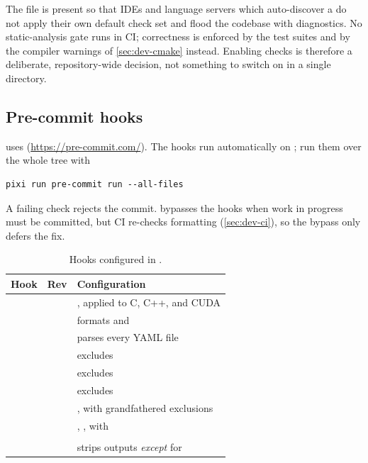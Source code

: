 The file is present so that IDEs and language servers which auto-discover a
 do not apply their own default check set and flood the
codebase with diagnostics. No static-analysis gate runs in CI; correctness is
enforced by the test suites and by the compiler warnings of
\cref{sec:dev-cmake} instead. Enabling checks is therefore a deliberate,
repository-wide decision, not something to switch on in a single directory.

\subsection{Pre-commit hooks}

\lupnt{} uses  (\url{https://pre-commit.com/}). The hooks run
automatically on ; run them over the whole tree with

\begin{lstlisting}[language=shell]
pixi run pre-commit run --all-files
\end{lstlisting}

A failing check rejects the commit.  bypasses the
hooks when work in progress must be committed, but CI re-checks formatting
(\cref{sec:dev-ci}), so the bypass only defers the fix.

\begin{table}[H]
  \centering
  \caption{Hooks configured in .}
  \label{tab:dev-precommit}
  \small
  \begin{tabularx}{\textwidth}{llL}
    \toprule
    Hook & Rev & Configuration \\
    \midrule
       &  & , applied to C, C++, and CUDA \\
       &  & formats  and  \\
         &   & parses every YAML file \\
      &  & excludes  \\
    &  & excludes  \\
      &  & excludes  \\
     &  & , with grandfathered
                                                     exclusions \\
         &   & , ,
                                             with  \\
              &  &  \\
         &   & strips outputs \emph{except} for
                                              \\
    \bottomrule
  \end{tabularx}
\end{table}

